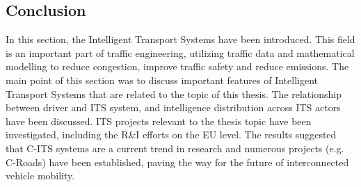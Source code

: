 \documentclass[main.tex]{subfiles}
\begin{document}
\subsection{Conclusion}

In this section, the Intelligent Transport Systems have been introduced. This field is an
important part of traffic engineering, utilizing traffic data and mathematical modelling to
reduce congestion, improve traffic safety and reduce emissions. The main point of this section
was to discuss important features of Intelligent Transport Systems that are related to 
the topic of this thesis. The relationship between driver and ITS system, and intelligence 
distribution across ITS actors have been discussed. ITS projects relevant to the thesis topic
have been investigated, including the R\&I efforts on the EU level. The results suggested that
C-ITS systems are a current trend in research and numerous projects (e.g. C-Roads) have been
established, paving the way for the future of interconnected vehicle mobility. 

\clearpage
\end{document}
